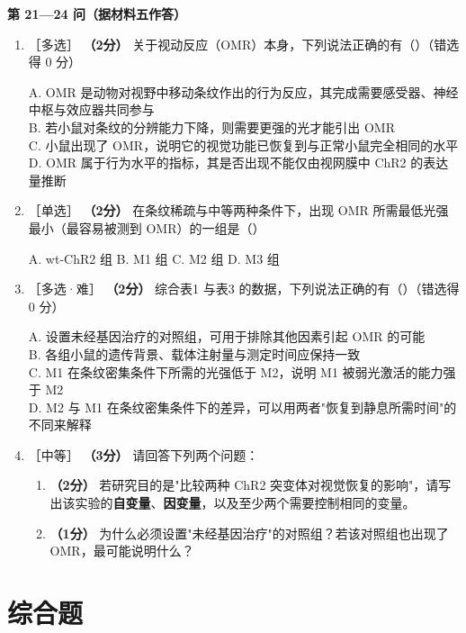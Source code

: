 \documentclass[UTF8,a4paper,11pt]{ctexart}
\newcommand{\pt}[1]{\textbf{（#1分）}}
\newcommand{\lv}[1]{{\small\color{deepgreen}［#1］}}
\newcommand{\choice}[1]{\par\smallskip\noindent #1\par}
\begin{document}
\begin{qbox}
\noindent\textbf{\color{deepgreen}第 21—24 问（据材料五作答）}
\begin{enumerate}[leftmargin=2.2em,itemsep=5pt,start=21]
\item \lv{多选} \pt{2} 关于视动反应（OMR）本身，下列说法正确的有（\quad）（错选得 0 分）
\choice{A. OMR 是动物对视野中移动条纹作出的行为反应，其完成需要感受器、神经中枢与效应器共同参与\\
B. 若小鼠对条纹的分辨能力下降，则需要更强的光才能引出 OMR\\
C. 小鼠出现了 OMR，说明它的视觉功能已恢复到与正常小鼠完全相同的水平\\
D. OMR 属于行为水平的指标，其是否出现不能仅由视网膜中 ChR2 的表达量推断}

\item \lv{单选} \pt{2} 在条纹稀疏与中等两种条件下，出现 OMR 所需最低光强最小（最容易被测到 OMR）的一组是（\quad）
\choice{A. wt-ChR2 组 \quad B. M1 组 \quad C. M2 组 \quad D. M3 组}

\item \lv{多选·难} \pt{2} 综合表1 与表3 的数据，下列说法正确的有（\quad）（错选得 0 分）
\choice{A. 设置未经基因治疗的对照组，可用于排除其他因素引起 OMR 的可能\\
B. 各组小鼠的遗传背景、载体注射量与测定时间应保持一致\\
C. M1 在条纹密集条件下所需的光强低于 M2，说明 M1 被弱光激活的能力强于 M2\\
D. M2 与 M1 在条纹密集条件下的差异，可以用两者"恢复到静息所需时间"的不同来解释}

\item \lv{中等} \pt{3} 请回答下列两个问题：
\begin{enumerate}[label=(\arabic*),leftmargin=1.4em,itemsep=2pt]
\item \pt{2} 若研究目的是"比较两种 ChR2 突变体对视觉恢复的影响"，请写出该实验的\textbf{自变量}、\textbf{因变量}，以及至少两个需要控制相同的变量。
\item \pt{1} 为什么必须设置"未经基因治疗"的对照组？若该对照组也出现了 OMR，最可能说明什么？
\end{enumerate}
\end{enumerate}
\end{qbox}

\section{综合题}
\end{document}
